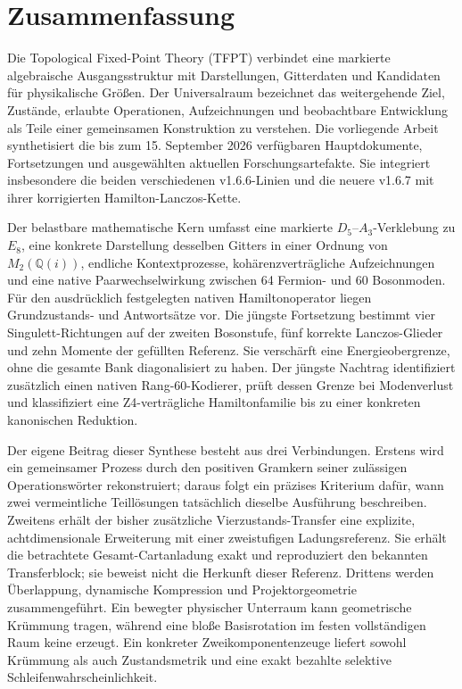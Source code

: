 
\maketitle

{
\setcounter{tocdepth}{2}
\tableofcontents
}
\section{Zusammenfassung}\label{zusammenfassung}

Die Topological Fixed-Point Theory (TFPT) verbindet eine markierte
algebraische Ausgangsstruktur mit Darstellungen, Gitterdaten und
Kandidaten für physikalische Größen. Der Universalraum bezeichnet das
weitergehende Ziel, Zustände, erlaubte Operationen, Aufzeichnungen und
beobachtbare Entwicklung als Teile einer gemeinsamen Konstruktion zu
verstehen. Die vorliegende Arbeit synthetisiert die bis zum 15.
September 2026 verfügbaren Hauptdokumente, Fortsetzungen und
ausgewählten aktuellen Forschungsartefakte. Sie integriert insbesondere
die beiden verschiedenen v1.6.6-Linien und die neuere v1.6.7 mit ihrer
korrigierten Hamilton-Lanczos-Kette.

Der belastbare mathematische Kern umfasst eine markierte
\(D_5\)--\(A_3\)-Verklebung zu \(E_8\), eine konkrete Darstellung
desselben Gitters in einer Ordnung von \(M_2(\mathbb Q(i))\), endliche
Kontextprozesse, kohärenzverträgliche Aufzeichnungen und eine native
Paarwechselwirkung zwischen 64 Fermion- und 60 Bosonmoden. Für den
ausdrücklich festgelegten nativen Hamiltonoperator liegen Grundzustands-
und Antwortsätze vor. Die jüngste Fortsetzung bestimmt vier
Singulett-Richtungen auf der zweiten Bosonstufe, fünf korrekte
Lanczos-Glieder und zehn Momente der gefüllten Referenz. Sie verschärft
eine Energieobergrenze, ohne die gesamte Bank diagonalisiert zu haben.
Der jüngste Nachtrag identifiziert zusätzlich einen nativen
Rang-60-Kodierer, prüft dessen Grenze bei Modenverlust und klassifiziert
eine Z4-verträgliche Hamiltonfamilie bis zu einer konkreten kanonischen
Reduktion.

Der eigene Beitrag dieser Synthese besteht aus drei Verbindungen.
Erstens wird ein gemeinsamer Prozess durch den positiven Gramkern seiner
zulässigen Operationswörter rekonstruiert; daraus folgt ein präzises
Kriterium dafür, wann zwei vermeintliche Teillösungen tatsächlich
dieselbe Ausführung beschreiben. Zweitens erhält der bisher zusätzliche
Vierzustands-Transfer eine explizite, achtdimensionale Erweiterung mit
einer zweistufigen Ladungsreferenz. Sie erhält die betrachtete
Gesamt-Cartanladung exakt und reproduziert den bekannten Transferblock;
sie beweist nicht die Herkunft dieser Referenz. Drittens werden
Überlappung, dynamische Kompression und Projektorgeometrie
zusammengeführt. Ein bewegter physischer Unterraum kann geometrische
Krümmung tragen, während eine bloße Basisrotation im festen
vollständigen Raum keine erzeugt. Ein konkreter Zweikomponentenzeuge
liefert sowohl Krümmung als auch Zustandsmetrik und eine exakt bezahlte
selektive Schleifenwahrscheinlichkeit.

